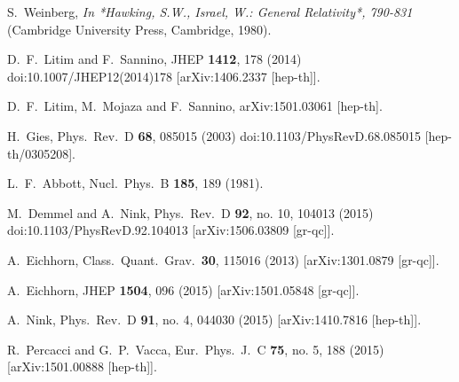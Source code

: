 \documentclass[twocolumn,prd,superscriptaddress,preprintnumbers,amsmath,amssymb,nofootinbib]{revtex4}
\begin{document}
\begin{thebibliography}{99}

  S.~Weinberg,
{\it  In *Hawking, S.W., Israel, W.: General Relativity*, 790-831}
(Cambridge University Press, Cambridge, 1980).

  D.~F.~Litim and F.~Sannino,
  JHEP {\bf 1412}, 178 (2014)
  doi:10.1007/JHEP12(2014)178
  [arXiv:1406.2337 [hep-th]].
  
  D.~F.~Litim, M.~Mojaza and F.~Sannino,
  arXiv:1501.03061 [hep-th].
  
  H.~Gies,
  Phys.\ Rev.\ D {\bf 68}, 085015 (2003)
  doi:10.1103/PhysRevD.68.085015
  [hep-th/0305208].
  
  L.~F.~Abbott,
  Nucl.\ Phys.\  B {\bf 185}, 189 (1981).

  M.~Demmel and A.~Nink,
  Phys.\ Rev.\ D {\bf 92}, no. 10, 104013 (2015)
  doi:10.1103/PhysRevD.92.104013
  [arXiv:1506.03809 [gr-qc]].
  
  A.~Eichhorn,
  Class.\ Quant.\ Grav.\  {\bf 30}, 115016 (2013)
  [arXiv:1301.0879 [gr-qc]].
  
  A.~Eichhorn,
  JHEP {\bf 1504}, 096 (2015)
  [arXiv:1501.05848 [gr-qc]].
  
  A.~Nink,
  Phys.\ Rev.\ D {\bf 91}, no. 4, 044030 (2015)
  [arXiv:1410.7816 [hep-th]].
  
  R.~Percacci and G.~P.~Vacca,
  Eur.\ Phys.\ J.\ C {\bf 75}, no. 5, 188 (2015)
  [arXiv:1501.00888 [hep-th]].
  

\end{thebibliography}
\end{document}

